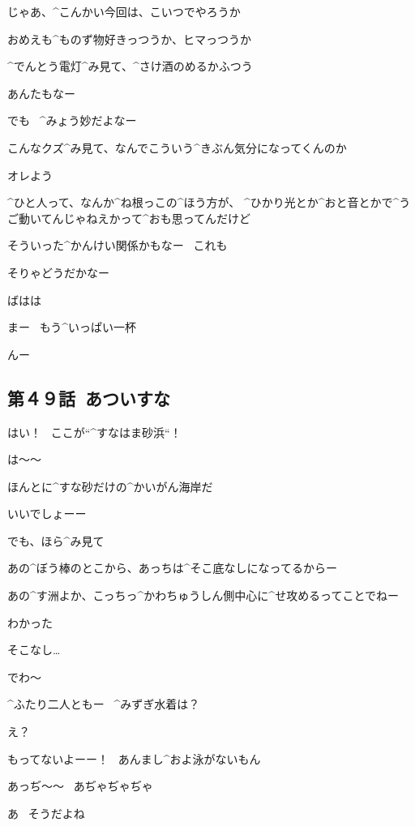 \page[68]
\Person じゃあ、^{こんかい}{今回}は、こいつでやろうか

\Person おめえも^{ものず}{物好}きっつうか、ヒマっつうか

\Person ^{でんとう}{電灯}^{み}{見}て、^{さけ}{酒}のめるかふつう

\Person あんたもなー

\page[70]
\Person でも
\ ^{みょう}{妙}だよなー

\Person こんなクズ^{み}{見}て、なんでこういう^{きぶん}{気分}になってくんのか

\Person オレよう

\Person ^{ひと}{人}って、なんか^{ね}{根}っこの^{ほう}{方}が、
^{ひかり}{光}とか^{おと}{音}とかで^{うご}{動}いてんじゃねえかって^{おも}{思}ってんだけど

\Person そういった^{かんけい}{関係}かもなー
\ これも

\page
\Person そりゃどうだかなー

\Person ばはは

\Person まー
\ もう^{いっぱい}{一杯}

\Person んー


\subsection{第４９話\ あついすな}

\page[78]
\Alpha はい！
\ ここが“^{すなはま}{砂浜}“！

\Takahiro は〜〜

\Takahiro ほんとに^{すな}{砂}だけの^{かいがん}{海岸}だ

\Alpha いいでしょーー

\page
\Alpha でも、ほら^{み}{見}て

\Alpha あの^{ぼう}{棒}のとこから、あっちは^{そこ}{底}なしになってるからー

\Alpha あの^{す}{洲}よか、こっちっ^{かわちゅうしん}{側中心}に^{せ}{攻}めるってことでねー

\Takahiro わかった

\Makki そこなし…

\page
\Makki でわ〜

\page
\Alpha ^{ふたり}{二人}ともー
\ ^{みずぎ}{水着}は？

\Takahiro え？

\Takahiro もってないよーー！
\ あんまし^{およ}{泳}がないもん

\Takahiro あっぢ〜〜
\ あぢゃぢゃぢゃ

\Alpha あ
\ そうだよね

